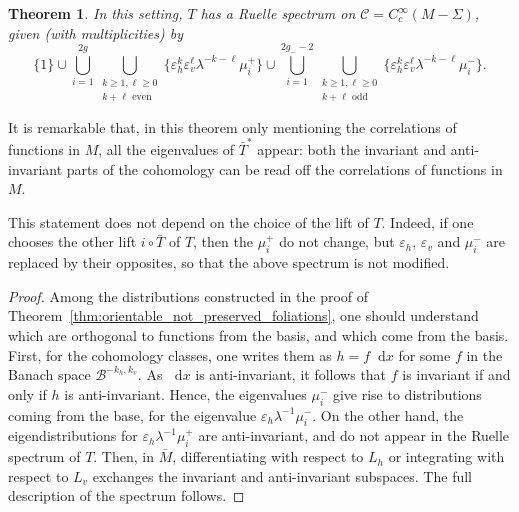 \documentclass[11pt, a4paper, oneside, final, pagebackref]{amsart}
\newcommand{\boC}{\mathcal{C}}
\newcommand{\boB}{\mathcal{B}}
\newcommand{\dd}{\mathop{}\!\mathrm{d}}
\renewcommand{\epsilon}{\varepsilon}
\renewcommand{\geq}{\geqslant}
\newtheorem{thm}{Theorem}[section]
\theoremstyle{definition}
\numberwithin{equation}{section}
\begin{document}
\begin{thm}
\label{thm:ruelle_spectrum_nonorientable} In this setting, $T$ has a Ruelle
spectrum on $\boC = C^\infty_c(M-\Sigma)$, given (with multiplicities) by
\begin{equation*}
  \{1\} \cup
  \bigcup_{i=1}^{2g} \bigcup_{\substack{k \geq 1, \ell \geq 0\\k + \ell \text{ even}}}
     \{\epsilon_h^k \epsilon_v^\ell \lambda^{-k-\ell}\mu_i^+\}
  \cup
  \bigcup_{i=1}^{2g_- -2} \bigcup_{\substack{k \geq 1, \ell \geq 0\\k + \ell \text{ odd}}}
     \{\epsilon_h^k \epsilon_v^\ell \lambda^{-k-\ell}\mu_i^-\}.
\end{equation*}
\end{thm}
It is remarkable that, in this theorem only mentioning the correlations of
functions in $M$, all the eigenvalues of $\bar T^*$ appear: both the
invariant and anti-invariant parts of the cohomology can be read off the
correlations of functions in $M$.

This statement does not depend on the choice of the lift of $T$. Indeed, if
one chooses the other lift $i\circ \bar T$ of $T$, then the $\mu_i^+$ do not
change, but $\epsilon_h$, $\epsilon_v$ and $\mu_i^-$ are replaced by their
opposites, so that the above spectrum is not modified.
\begin{proof}
Among the distributions constructed in the proof of
Theorem~\ref{thm:orientable_not_preserved_foliations}, one should understand
which are orthogonal to functions from the basis, and which come from the
basis. First, for the cohomology classes, one writes them as $h = f \dd x$
for some $f$ in the Banach space $\boB^{-k_h, k_v}$. As $\dd x$ is
anti-invariant, it follows that $f$ is invariant if and only if $h$ is
anti-invariant. Hence, the eigenvalues $\mu_i^-$ give rise to distributions
coming from the base, for the eigenvalue $\epsilon_h \lambda^{-1} \mu_i^-$.
On the other hand, the eigendistributions for $\epsilon_h
\lambda^{-1}\mu_i^+$ are anti-invariant, and do not appear in the Ruelle
spectrum of $T$. Then, in $\bar M$, differentiating with respect to $L_h$ or
integrating with respect to $L_v$ exchanges the invariant and anti-invariant
subspaces. The full description of the spectrum follows.
\end{proof}
\end{document}
